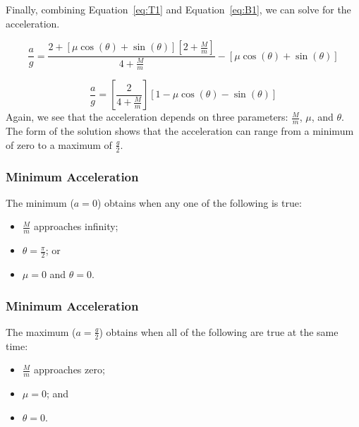 \documentclass[twocolumn]{article}
\begin{document}
Finally, combining Equation~\ref{eq:T1} and Equation~\ref{eq:B1}, we can solve
for the acceleration.
\begin{small}
\begin{equation*}
   \frac{a}{g} = \frac{2 + [\mu \cos(\theta) + \sin(\theta)][2 +
   \tfrac{M}{m}]}{4 + \tfrac{M}{m}} - [\mu \cos(\theta) + \sin(\theta)]
\end{equation*}
\end{small}
\begin{equation}
   \frac{a}{g} = \left[ \frac{2}{4 + \tfrac{M}{m}} \right] [1 - \mu
   \cos(\theta) - \sin(\theta)]
\end{equation}
Again, we see that the acceleration depends on three parameters:
$\tfrac{M}{m}$, $\mu$, and $\theta$. The form of the solution shows that the
acceleration can range from a minimum of zero to a maximum of $\tfrac{g}{2}$.

\subsubsection{Minimum Acceleration}

The minimum ($a = 0$) obtains when any one of the following is true:
\begin{itemize}
   \item $\tfrac{M}{m}$ approaches infinity;
   \item $\theta = \tfrac{\pi}{2}$; or
   \item $\mu = 0$ and $\theta = 0$.
\end{itemize}

\subsubsection{Minimum Acceleration}

The maximum ($a = \tfrac{g}{2}$) obtains when all of the following are true at
the same time:
\begin{itemize}
   \item $\tfrac{M}{m}$ approaches zero;
   \item $\mu = 0$; and
   \item $\theta = 0$.
\end{itemize}
\end{document}
